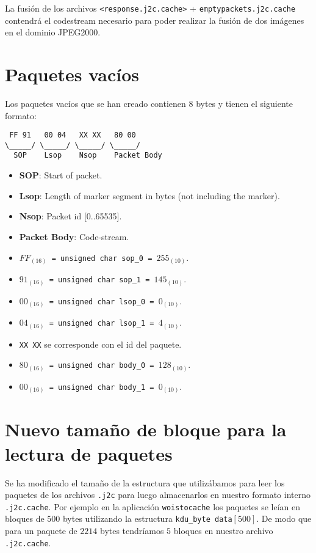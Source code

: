 \documentclass[11pt,a4paper]{article}
\begin{document}
La fusi\'on de los archivos \texttt{<response.j2c.cache>} + \texttt{emptypackets.j2c.cache} contendr\'a
el codestream necesario para poder realizar la fusi\'on de dos im\'agenes en el dominio JPEG2000.

\section{Paquetes vac\'ios}

Los paquetes vac\'ios que se han creado contienen 8 bytes y tienen el siguiente formato:

\begin{verbatim}  
 FF 91   00 04   XX XX   80 00
\_____/ \_____/ \_____/ \_____/
  SOP    Lsop    Nsop    Packet Body
\end{verbatim}

  \begin{itemize}
    \item \textbf{SOP}: Start of packet.
    \item \textbf{Lsop}: Length of marker segment in bytes (not including the marker).
    \item \textbf{Nsop}: Packet id [0..65535].
    \item \textbf{Packet Body}: Code-stream.
  \end{itemize}


  \begin{itemize}
    \item \texttt{$FF_{(16)}$ = unsigned char sop\_0 = $255_{(10)}$}.
    \item \texttt{$91_{(16)}$ = unsigned char sop\_1 = $145_{(10)}$}.
    \item \texttt{$00_{(16)}$ = unsigned char lsop\_0 = $0_{(10)}$}.
    \item \texttt{$04_{(16)}$ = unsigned char lsop\_1 = $4_{(10)}$}.
    \item \texttt{XX XX} se corresponde con el id del paquete.
    \item \texttt{$80_{(16)}$ = unsigned char body\_0 = $128_{(10)}$}.
    \item \texttt{$00_{(16)}$ = unsigned char body\_1 = $0_{(10)}$}.
  \end{itemize}

\section{Nuevo tama\~no de bloque para la lectura de paquetes}

Se ha modificado el tama\~no de la estructura que utiliz\'abamos para leer los paquetes de 
los archivos \texttt{.j2c} para luego almacenarlos en nuestro formato interno \texttt{.j2c.cache}. 
Por ejemplo en la aplicaci\'on \texttt{woistocache} los paquetes se le\'ian en bloques de $500$ bytes 
utilizando la estructura \texttt{kdu\_byte data$[500]$}. De modo que para un paquete de $2214$ bytes 
tendr\'iamos $5$ bloques en nuestro archivo \texttt{.j2c.cache}.
\end{document}
